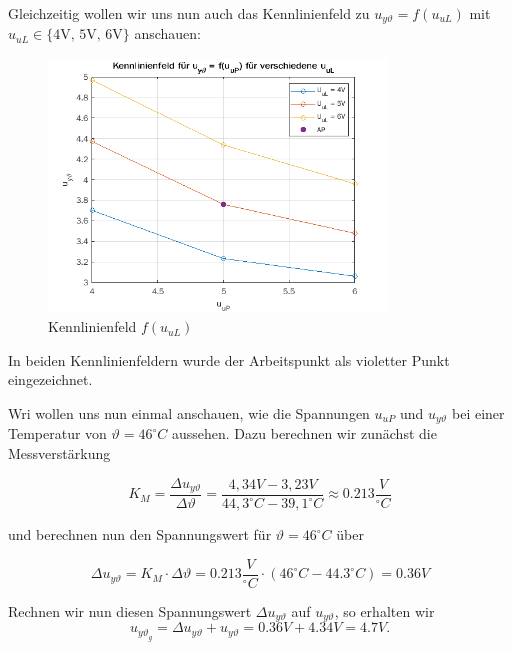 \documentclass{report}
\begin{document}
Gleichzeitig wollen wir uns nun auch das Kennlinienfeld zu $u_{y\vartheta} = f(u_{uL})$ mit $u_{uL} \in \{\text{4V, 5V, 6V}\}$ anschauen:

\begin{figure}[h]
  \centering
  \includegraphics[width=0.8\textwidth]{../assets/images/RTP/kennlinieA12rtp1.png}
  \caption{Kennlinienfeld $f(u_{uL})$}
  \label{fig:kennux}
\end{figure}

In beiden Kennlinienfeldern wurde der Arbeitspunkt als violetter Punkt eingezeichnet.

Wri wollen uns nun einmal anschauen, wie die Spannungen $u_{uP}$ und $u_{y\vartheta}$ bei einer Temperatur von $\vartheta = 46^{\circ}C$ aussehen. Dazu berechnen wir zunächst die Messverstärkung

\begin{equation}
  \label{eq:12}
  K_{M} = \frac{\Delta u_{y\vartheta}}{\Delta \vartheta} = \frac{4,34V-3,23V}{44,3^{\circ}C-39,1^{\circ}C} \approx 0.213 \frac{V}{^{\circ}C}
\end{equation}

und berechnen nun den Spannungswert für $\vartheta = 46^{\circ}C$ über

\begin{equation}
  \label{eq:13}
  \Delta u_{y\vartheta} = K_{M} \cdot \Delta \vartheta = 0.213\frac{V}{^{\circ}C} \cdot (46^{\circ}C - 44.3^{\circ}C) = 0.36V
\end{equation}

Rechnen wir nun diesen Spannungswert $\Delta u_{y\vartheta}$ auf $u_{y\vartheta}$, so erhalten wir
\begin{equation}
  \label{eq:14}
  u_{y\vartheta}_{g} = \Delta u_{y\vartheta} + u_{y\vartheta} = 0.36V + 4.34V = 4.7V.
\end{equation}
\end{document}
